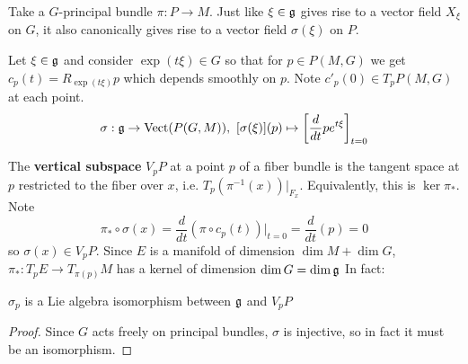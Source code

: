 		Take a $G$-principal bundle $\pi: P \rightarrow M$. 
		Just like $\xi \in \frak g$ gives rise to a vector field $X_\xi$ on $G$, it also canonically gives rise to a vector field $\sigma(\xi)$ on $P$.
		\begin{defn}
			Let $\xi \in \frak g$ and consider $\exp(t \xi) \in G$ so that for $p \in P(M,G)$ we get $c_p(t) = R_{\exp(t \xi)} p$ which depends smoothly on $p$. Note $c'_p(0) \in T_p P(M,G)$ at each point.
			\begin{equation}
				\sigma: \frak g \rightarrow \text{Vect}(P(G,M)), ~ [\sigma(\xi)](p) \mapsto \left[ \frac{d}{dt} p e^{t \xi}\right]_{t=0}
			\end{equation}
		\end{defn}
		The \textbf{vertical subspace} $V_p P$ at a point $p$ of a fiber bundle is the tangent space at $p$ restricted to the fiber over $x$, i.e. $T_p (\pi^{-1}(x))|_{F_x}$. Equivalently, this is $\ker \pi_*$. Note
		\begin{equation}
			\pi_* \circ \sigma(x) = \frac{d}{dt} (\pi \circ c_p(t))|_{t=0} = \frac{d}{dt} (p) = 0
		\end{equation} 
		so $\sigma(x) \in V_p P$. 
		Since $E$ is a manifold of dimension $\dim M + \dim G$, $\pi_*: T_pE \rightarrow T_{\pi(p)}M$ has a kernel of dimension $\dim G = \dim \frak g$
		In fact:
		\begin{prop}
			$\sigma_p$ is a Lie algebra isomorphism between $\frak g$ and $V_pP$
		\end{prop}
		 \begin{proof}
		 	Since $G$ acts freely on principal bundles, $\sigma$ is injective, so in fact it must be an isomorphism.
		 \end{proof}
	

